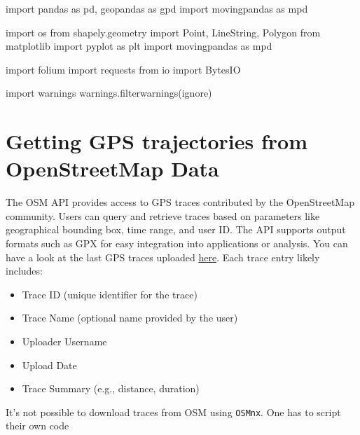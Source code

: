 \documentclass[
  letterpaper,
  DIV=11,
  numbers=noendperiod]{scrreprt}
\newenvironment{Shaded}{\begin{snugshade}}{\end{snugshade}}
\newcommand{\ImportTok}[1]{\textcolor[rgb]{0.00,0.46,0.62}{#1}}
\newcommand{\NormalTok}[1]{\textcolor[rgb]{0.00,0.23,0.31}{#1}}
\newcommand{\StringTok}[1]{\textcolor[rgb]{0.13,0.47,0.30}{#1}}
\providecommand{\tightlist}{%
  \setlength{\itemsep}{0pt}\setlength{\parskip}{0pt}}\usepackage{longtable,booktabs,array}
\begin{document}
\begin{Shaded}
\begin{Highlighting}[]
\ImportTok{import}\NormalTok{ pandas }\ImportTok{as}\NormalTok{ pd, geopandas }\ImportTok{as}\NormalTok{ gpd}
\ImportTok{import}\NormalTok{ movingpandas }\ImportTok{as}\NormalTok{ mpd}

\ImportTok{import}\NormalTok{ os}
\ImportTok{from}\NormalTok{ shapely.geometry }\ImportTok{import}\NormalTok{ Point, LineString, Polygon}
\ImportTok{from}\NormalTok{ matplotlib }\ImportTok{import}\NormalTok{ pyplot }\ImportTok{as}\NormalTok{ plt}
\ImportTok{import}\NormalTok{ movingpandas }\ImportTok{as}\NormalTok{ mpd}

\ImportTok{import}\NormalTok{ folium}
\ImportTok{import}\NormalTok{ requests}
\ImportTok{from}\NormalTok{ io }\ImportTok{import}\NormalTok{ BytesIO}

\ImportTok{import}\NormalTok{ warnings}
\NormalTok{warnings.filterwarnings(}\StringTok{\textquotesingle{}ignore\textquotesingle{}}\NormalTok{)}
\end{Highlighting}
\end{Shaded}

\section{Getting GPS trajectories from OpenStreetMap
Data}\label{getting-gps-trajectories-from-openstreetmap-data}

The OSM API provides access to GPS traces contributed by the
OpenStreetMap community. Users can query and retrieve traces based on
parameters like geographical bounding box, time range, and user ID. The
API supports output formats such as GPX for easy integration into
applications or analysis. You can have a look at the last GPS traces
uploaded \href{https://www.openstreetmap.org/traces}{here}. Each trace
entry likely includes:

\begin{itemize}
\tightlist
\item
  Trace ID (unique identifier for the trace)
\item
  Trace Name (optional name provided by the user)
\item
  Uploader Username
\item
  Upload Date
\item
  Trace Summary (e.g., distance, duration)
\end{itemize}

It's not possible to download traces from OSM using \texttt{OSMnx}. One
has to script their own code
\end{document}
